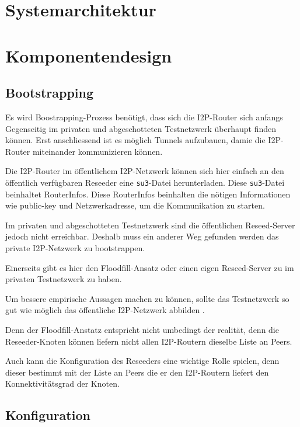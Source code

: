\newpage

\section{Systemarchitektur}

\section{Komponentendesign}


\subsection{Bootstrapping}

Es wird Boostrapping-Prozess benötigt, dass sich die I2P-Router sich anfangs Gegenseitig im privaten und abgeschotteten Testnetzwerk überhaupt finden können.
Erst anschliessend ist es möglich Tunnels aufzubauen, damie die I2P-Router miteinander kommunizieren können.

Die I2P-Router im öffentlichem I2P-Netzwerk können sich hier einfach an den öffentlich verfügbaren Reseeder eine \lstinline|su3|-Datei herunterladen.
Diese \lstinline|su3|-Datei beinhaltet RouterInfos. 
Diese RouterInfos beinhalten die nötigen Informationen wie public-key und Netzwerkadresse, um die Kommunikation zu starten.

Im privaten und abgeschotteten Testnetzwerk sind die öffentlichen Reseed-Server jedoch nicht erreichbar.
Deshalb muss ein anderer Weg gefunden werden das private I2P-Netzwerk zu bootstrappen.

Einerseits gibt es hier den Floodfill-Ansatz oder einen eigen Reseed-Server zu im privaten Testnetzwerk zu haben.


Um bessere empirische Aussagen machen zu können, sollte das Testnetzwerk so gut wie möglich das öffentliche I2P-Netzwerk abbilden .

Denn der Floodfill-Anstatz entspricht nicht umbedingt der realität, denn die Reseeder-Knoten können liefern nicht allen I2P-Routern dieselbe Liste an Peers.

Auch kann die Konfiguration des Reseeders eine wichtige Rolle spielen, denn dieser bestimmt mit der Liste an Peers die er den I2P-Routern liefert den Konnektivitätsgrad der Knoten.


\subsection{Konfiguration}

